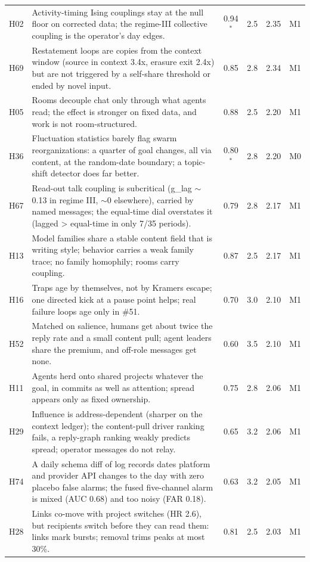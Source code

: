 \begin{table}[t]
\begin{tabular}{@{}l p{} c c c c@{}}
H02 & Activity-timing Ising couplings stay at the null floor on corrected data; the regime-III collective coupling is the operator's day edges. & 0.94$^\ast$ & 2.5 & 2.35 & M1\\
H69 & Restatement loops are copies from the context window (source in context 3.4x, erasure exit 2.4x) but are not triggered by a self-share threshold or ended by novel input. & 0.85 & 2.8 & 2.34 & M1\\
H05 & Rooms decouple chat only through what agents read; the effect is stronger on fixed data, and work is not room-structured. & 0.88 & 2.5 & 2.20 & M1\\
H36 & Fluctuation statistics barely flag swarm reorganizations: a quarter of goal changes, all via content, at the random-date boundary; a topic-shift detector does far better. & 0.80$^\ast$ & 2.8 & 2.20 & M0\\
H67 & Read-out talk coupling is subcritical (g\_lag $\sim$0.13 in regime III, $\sim$0 elsewhere), carried by named messages; the equal-time dial overstates it (lagged > equal-time in only 7/35 periods). & 0.79 & 2.8 & 2.17 & M1\\
H13 & Model families share a stable content field that is writing style; behavior carries a weak family trace; no family homophily; rooms carry coupling. & 0.87 & 2.5 & 2.17 & M1\\
H16 & Traps age by themselves, not by Kramers escape; one directed kick at a pause point helps; real failure loops age only in \#51. & 0.70 & 3.0 & 2.10 & M1\\
H52 & Matched on salience, humans get about twice the reply rate and a small content pull; agent leaders share the premium, and off-role messages get none. & 0.60 & 3.5 & 2.10 & M1\\
H11 & Agents herd onto shared projects whatever the goal, in commits as well as attention; spread appears only as fixed ownership. & 0.75 & 2.8 & 2.06 & M1\\
H29 & Influence is address-dependent (sharper on the context ledger); the content-pull driver ranking fails, a reply-graph ranking weakly predicts spread; operator messages do not relay. & 0.65 & 3.2 & 2.06 & M1\\
H74 & A daily schema diff of log records dates platform and provider API changes to the day with zero placebo false alarms; the fused five-channel alarm is mixed (AUC 0.68) and too noisy (FAR 0.18). & 0.63 & 3.2 & 2.05 & M1\\
H28 & Links co-move with project switches (HR 2.6), but recipients switch before they can read them: links mark bursts; removal trims peaks at most 30\%. & 0.81 & 2.5 & 2.03 & M1\\
\bottomrule
\end{tabular}
\end{table}
